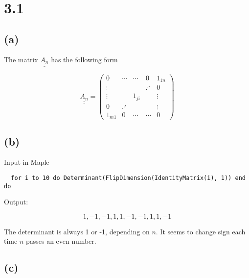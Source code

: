 \documentclass[11pt]{article}
\begin{document}
\maketitle
\thispagestyle{firststyle}

\section*{3.1}

\subsection{(a)}

The matrix \(\underline{\underline{{A_n}}}\) has the following form

\begin{equation}
  \underline{\underline{{A_n}}}=
  \begin{pmatrix}
   0      & \cdots  & \cdots      & 0 & 1_{1n} \\
  \vdots  &        &         & \iddots &  0 \\
  \vdots  &         & 1_{ji}  &          & \vdots  \\
   0      & \iddots &         &   &  \vdots \\
   1_{m1} & 0  & \cdots  & \cdots &  0
\end{pmatrix}
\end{equation}

\subsection{(b)}

Input in Maple

\begin{verbatim}
  for i to 10 do Determinant(FlipDimension(IdentityMatrix(i), 1)) end do
\end{verbatim}

Output:

\begin{equation}
1, -1, -1, 1, 1, -1, -1, 1, 1, -1
\end{equation}

The determinant is always 1 or -1, depending on \(n\).
It seems to change sign each time \(n\) passes an even number.

\subsection{(c)}
\end{document}
